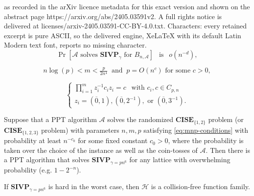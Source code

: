 \documentclass[10pt,a4paper]{amsart}
\def\CA{{\mathcal A}}
\def\CH{{\mathcal H}}
\def\CISE{{\mathbf{CISE}}}
\def\SIVP{{\mathbf{SIVP}}}
\def\ovo{{\overline{0}}}
\begin{document}
as recorded in the arXiv licence metadata for this exact version and shown on the abstract page https://arxiv.org/abs/2405.03591v2. A full rights notice is delivered at licenses/arxiv-2405.03591-CC-BY-4.0.txt. Characters: every retained excerpt is pure ASCII, so the delivered engine, XeLaTeX with its default Latin Modern text font, reports no missing character.
\begin{equation}\label{eq:SIVP-hardness}
\Pr[\CA \mbox{ solves } \SIVP_{\gamma} \mbox{ for } B_{n,\CA}] 
\ \ \mbox{ is }\ \  o(n^{-d}),
\end{equation}

\begin{equation}\label{eq:mnp-conditions}
n\log(p) < m < \tfrac{p}{2n^4}
\ \mbox{ and }\ 
p=O(n^c) \mbox{ for some }c>0,
\end{equation}

\begin{equation}\label{eq:CSE-123}
\left\{
\begin{array}{l}
\prod_{i=1}^m z_i^{-1} c_i z_i= c\ \  \mbox{ with } c_i,c\in C_{p,n}\\
z_i=(\ovo,1),(\ovo,2^{-1}),\mbox{ or }(\ovo,3^{-1}).
\end{array}
\right.
\end{equation}

\begin{thm}\label{th:CISE-hard}
Suppose that a PPT algorithm $\CA$ solves
the randomized $\CISE_{\{1,2\}}$ problem 
(or $\CISE_{\{1,2,3\}}$ problem)
with parameters $n,m,p$ satisfying \eqref{eq:mnp-conditions}
with probability at least $n^{-c_0}$ for some fixed constant $c_0>0$,
where the probability is taken over the choice of 
the instance as well as the coin-tosses of $\CA$.
Then there is a PPT algorithm
that solves $\SIVP_{\gamma=pn^6}$ for any lattice
with overwhelming probability (e.g. $1-2^{-n}$).
\end{thm}

\begin{prop}
If $\SIVP_{\gamma=pn^6}$ is hard in the worst case, then
$\CH$ is a collision-free function family.
\end{prop}
\end{document}
